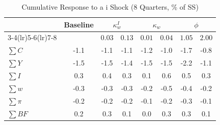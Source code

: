 \begin{table}[htbp]
\centering
\caption{Cumulative Response to a i Shock (8 Quarters, \% of SS)}
\label{tab:dyn_robustness}
\small\setlength{\tabcolsep}{5pt}
\begin{tabular}{lccc|cc|cc}
\toprule
 & Baseline & \multicolumn{2}{c}{$\kappa_{w}^{I}$} & \multicolumn{2}{c}{$\kappa_w$} & \multicolumn{2}{c}{$\phi$} \\
\cmidrule(lr){3-4}\cmidrule(lr){5-6}\cmidrule(lr){7-8}
 & & $0.03$ & $0.13$ & $0.01$ & $0.04$ & $1.05$ & $2.00$ \\
\midrule
$\sum C$ & -1.1 & -1.1 & -1.1 & -1.2 & -1.0 & -1.7 & -0.8 \\
$\sum Y$ & -1.5 & -1.5 & -1.4 & -1.5 & -1.5 & -2.2 & -1.1 \\
$\sum I$ & 0.3 & 0.4 & 0.3 & 0.1 & 0.6 & 0.5 & 0.3 \\
$\sum w$ & -0.3 & -0.3 & -0.3 & -0.2 & -0.5 & -0.4 & -0.2 \\
$\sum \pi$ & -0.2 & -0.2 & -0.2 & -0.1 & -0.2 & -0.3 & -0.1 \\
$\sum BF$ & 0.2 & 0.3 & 0.1 & 0.0 & 0.3 & 0.3 & 0.1 \\
\bottomrule
\end{tabular}
\end{table}
